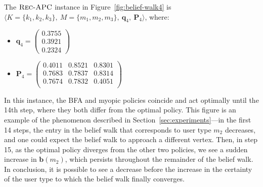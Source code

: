 \begin{example} \label{example:4}
The $\textsc{Rec-APC}$ instance in Figure~\ref{fig:belief-walk4} is $\langle K = \{ k_1, k_2, k_3 \},\ M = \{ m_1, m_2, m_3 \},\ \bm{q}_4,\ \bm{P}_4 \rangle$, where:
\begin{itemize}
\item $\bm{q}_4 = \begin{pmatrix} 0.3755 \\ 0.3921 \\ 0.2324 \end{pmatrix}$
\item $\bm{P}_4 = \begin{pmatrix} 0.4011 & 0.8521 & 0.8301 \\ 0.7683 & 0.7837 & 0.8314 \\ 0.7674 & 0.7832 & 0.4051 \\ \end{pmatrix}$
\end{itemize}
In this instance, the BFA and myopic policies coincide and act optimally until the 14th step, where they both differ from the optimal policy. This figure is an example of the phenomenon described in Section~\ref{sec:experiments}—in the first 14 steps, the entry in the belief walk that corresponds to user type $m_2$ decreases, and one could expect the belief walk to approach a different vertex. Then, in step 15, as the optimal policy diverges from the other two policies, we see a sudden increase in $\bm{b}(m_2)$, which persists throughout the remainder of the belief walk. In conclusion, it is possible to see a decrease before the increase in the certainty of the user type to which the belief walk finally converges.
\end{example}



    
